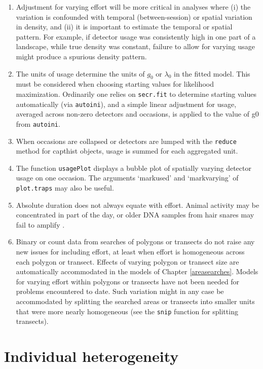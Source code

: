 \documentclass[
]{book}
\providecommand{\tightlist}{%
  \setlength{\itemsep}{0pt}\setlength{\parskip}{0pt}}
\begin{document}
\begin{enumerate}
\def\labelenumi{\arabic{enumi}.}
\tightlist
\item
  Adjustment for varying effort will be more critical in analyses where (i) the variation is confounded with temporal (between-session) or spatial variation in density, and (ii) it is important to estimate the temporal or spatial pattern. For example, if detector usage was consistently high in one part of a landscape, while true density was constant, failure to allow for varying usage might produce a spurious density pattern.
\item
  The units of usage determine the units of \(g_0\) or \(\lambda_0\) in the fitted model. This must be considered when choosing starting values for likelihood maximization. Ordinarily one relies on \texttt{secr.fit} to determine starting values automatically (via \texttt{autoini}), and a simple linear adjustment for usage, averaged across non-zero detectors and occasions, is applied to the value of g0 from \texttt{autoini}.
\item
  When occasions are collapsed or detectors are lumped with the \texttt{reduce} method for capthist objects, usage is summed for each aggregated unit.
\item
  The function \texttt{usagePlot} displays a bubble plot of spatially varying detector usage on one occasion. The arguments `markused' and `markvarying' of \texttt{plot.traps} may also be useful.
\item
  Absolute duration does not always equate with effort. Animal activity may be concentrated in part of the day, or older DNA samples from hair snares may fail to amplify \citep{ebm13}.
\item
  Binary or count data from searches of polygons or transects \citep{e11} do not raise any new issues for including effort, at least when effort is homogeneous across each polygon or transect. Effects of varying polygon or transect size are automatically accommodated in the models of Chapter \ref{areasearches}. Models for varying effort within polygons or transects have not been needed for problems encountered to date. Such variation might in any case be accommodated by splitting the searched areas or transects into smaller units that were more nearly homogeneous (see the \texttt{snip} function for splitting transects).
\end{enumerate}

\chapter{Individual heterogeneity}\label{individual-heterogeneity}
\end{document}
